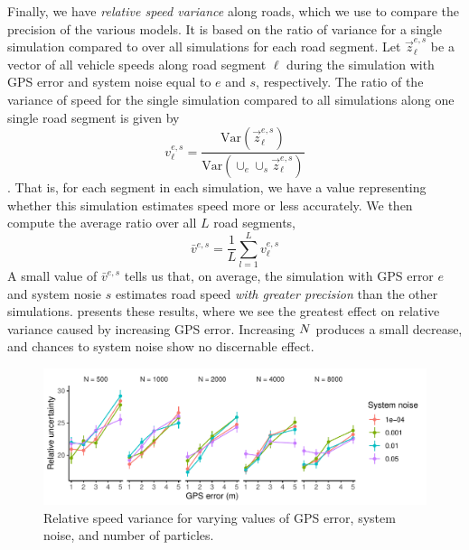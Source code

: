 Finally, we have \emph{relative speed variance} along roads, which we use to compare the precision of the various models. It is based on the ratio of variance for a single simulation compared to over all simulations for each road segment. Let $\vec z_\ell^{e,s}$ be a vector of all vehicle speeds along road segment $\ell$ during the simulation with GPS error and system noise equal to $e$ and $s$, respectively. The ratio of the variance of speed for the single simulation compared to all simulations along one single road segment is given by
\begin{equation}
\label{eq:rel_speed_var_ratio}
v_\ell^{e,s} =
\frac{
    \mathrm{Var}(\vec z_\ell^{e,s})
}{
    \mathrm{Var}(\cup_e\cup_s \vec z_\ell^{e,s})
}
\end{equation}.
That is, for each segment in each simulation, we have a value representing whether this simulation estimates speed more or less accurately. We then compute the average ratio over all $L$ road segments,
\begin{equation}
\label{eq:rel_speed_var}
\bar v^{e,s} = \frac{1}{L} \sum_{l=1}^L v_\ell^{e,s}
\end{equation}
A small value of $\bar v^{e,s}$ tells us that, on average, the simulation with GPS error $e$ and system nosie $s$ estimates road speed \emph{with greater precision} than the other simulations.  presents these results, where we see the greatest effect on relative variance caused by increasing GPS error. Increasing $N$ produces a small decrease, and chances to system noise show no discernable effect.


\begin{knitrout}
\color{fgcolor}\begin{figure}

{\centering \includegraphics[width=\textwidth]{figure/model_performance_var-1} 

}

\caption[Relative speed variance for varying values of GPS error, system noise, and number of particles]{Relative speed variance for varying values of GPS error, system noise, and number of particles.}\label{fig:model_performance_var}
\end{figure}


\end{knitrout}


